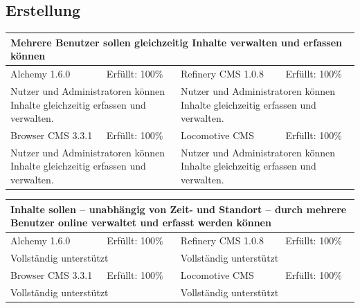 \subsection{Erstellung}
\begin{tabular}[!ht]{|l|l|l|l|}
\hline
\multicolumn{4}{|p{15cm}|}{\textbf{Mehrere Benutzer sollen gleichzeitig Inhalte verwalten und erfassen können}} \\
\hline
  Alchemy 1.6.0 & \cellcolor{green}Erfüllt: 100\% & Refinery CMS 1.0.8 & \cellcolor{green}Erfüllt: 100\% \\
  \hline
  \multicolumn{2}{|p{7.5cm}|}{Nutzer und Administratoren können Inhalte gleichzeitig erfassen und verwalten.}
   & \multicolumn{2}{p{7.5cm}|}{Nutzer und Administratoren können Inhalte gleichzeitig erfassen und verwalten.} \\
  \hline
  Browser CMS 3.3.1 & \cellcolor{green}Erfüllt: 100\% & Locomotive CMS & \cellcolor{green}Erfüllt: 100\% \\
  \hline
  \multicolumn{2}{|p{7.5cm}|}{Nutzer und Administratoren können Inhalte gleichzeitig erfassen und verwalten.} & \multicolumn{2}{p{7.5cm}|}{Nutzer und Administratoren können Inhalte gleichzeitig erfassen und verwalten.} \\
\hline
\end{tabular}
\newline
\newline
\newline
\begin{tabular}[!ht]{|l|l|l|l|}
\hline
\multicolumn{4}{|p{15cm}|}{\textbf{Inhalte sollen – unabhängig von Zeit- und Standort – durch mehrere Benutzer online verwaltet und erfasst werden können}} \\
\hline
  Alchemy 1.6.0 & \cellcolor{green}Erfüllt: 100\% & Refinery CMS 1.0.8 & \cellcolor{green}Erfüllt: 100\% \\
  \hline
  \multicolumn{2}{|p{7.5cm}|}{Vollständig unterstützt} & \multicolumn{2}{p{7.5cm}|}{Vollständig unterstützt} \\
  \hline
  Browser CMS 3.3.1 & \cellcolor{green}Erfüllt: 100\% & Locomotive CMS & \cellcolor{green}Erfüllt: 100\% \\
  \hline
  \multicolumn{2}{|p{7.5cm}|}{Vollständig unterstützt} & \multicolumn{2}{p{7.5cm}|}{Vollständig unterstützt} \\
\hline
\end{tabular}
\newline
\newline
\newline
